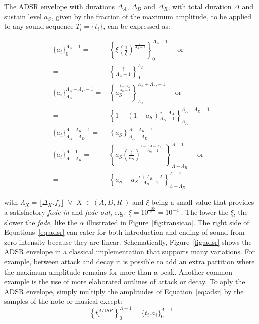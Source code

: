 The ADSR envelope with durations $\Delta_A$, $\Delta_D$ and $\Delta_R$, with total duration $\Delta$ and sustain level $a_S$, given by the fraction of the maximum amplitude, to be applied to any sound sequence $T_i=\{t_i\}$, can be expressed as:

\begin{equation}\label{eq:adsr}
\begin{split}
\{a_i\}_0^{\Lambda_A-1}  = & \left\{\xi\left(\frac{1}{\xi}\right)^{\frac{i}{\Lambda_A-1}}\right\}_0^{\Lambda_A-1} \quad \text{ or }\\ = & \left\{\frac{i}{\Lambda_A-1}\right\}_0^{\Lambda_A}\\
\{a_i\}_{\Lambda_A}^{\Lambda_A+\Lambda_D-1} = & \left\{a_S^{\frac{i-\Lambda_A}{\Lambda_D-1}}  \right\}_{\Lambda_A}^{\Lambda_A+\Lambda_D-1} \quad \text{ or } \\ = &  \left\{1-(1-a_S)\frac{i-\Lambda_A}{\Lambda_D-1}\right\}_{\Lambda_A}^{\Lambda_A+\Lambda_D-1}\\
\{ a_i \}_{\Lambda_A+\Lambda_D}^{\Lambda-\Lambda_R-1} = & \left\{ a_S \right\}_{\Lambda_A+\Lambda_D}^{\Lambda-\Lambda_R-1} \\
\{ a_i \}_{\Lambda-\Lambda_R}^{\Lambda-1}  = & \left\{ a_S\left(\frac{\xi}{a_S} \right)^{\frac{i-(\Lambda-\Lambda_R)}{\Lambda_R-1}} \right\}_{\Lambda-\Lambda_R}^{\Lambda-1} \quad \text{ or } \\ = &  \left\{ a_S - a_S\frac{i+\Lambda_R-\Lambda}{\Lambda_R-1}\right\}_{\Lambda-\Lambda_R}^{\Lambda-1} 
\end{split}
\end{equation}


\noindent with $\Lambda_X=\lfloor \Delta_X . f_s \rfloor\;\;\forall\;\; X \; \in
(A,D,R\;)$ and $\xi$ being a small value that provides a satisfactory \emph{fade in} and \emph{fade out}, e.g.\ $\xi=10^{\frac{-80}{20}}=10^{-4}\;$. The lower the $\xi$, the slower the \emph{fade}, like the $\alpha$ illustrated in Figure~\ref{fig:transicao}. The right side of Equations~\ref{eq:adsr} can cater for both introduction and ending of sound from zero intensity because they are linear. Schematically, Figure~\ref{fig:adsr} shows the ADSR envelope in a classical implementation that supports many variations. For example, between attack and decay it is possible to add an extra partition where the maximum amplitude remains for more than a peak. Another common example is the use of more elaborated outlines of attack or decay.
To aply the ADSR envelope, simply multiply the amplitudes of Equation~\ref{eq:adsr} by the samples of the note or musical except:
\begin{equation}\label{eq:adsrApl}
\left\{t_i^{ADSR}\right\}_0^{\Lambda-1} =\{t_i . a_i\}_0^{\Lambda-1}
\end{equation}

